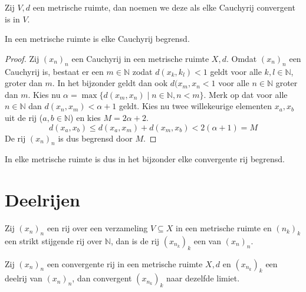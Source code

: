 \documentclass[main.tex]{subfiles}
\begin{document}
\begin{de}
  \label{de:metrische-ruimte-volledig}
  Zij $V,d$ een metrische ruimte, dan noemen we deze  als elke Cauchyrij convergent is in $V$.
\end{de}

\begin{st}
  \label{st:metrische-ruimte-cauchy-dan-begrensd}
  In een metrische ruimte is elke Cauchyrij begrensd.

  \begin{proof}
    Zij $(x_{n})_{n}$ een Cauchyrij in een metrische ruimte $X,d$.
    Omdat $(x_{n})_{n}$ een Cauchyrij is, bestaat er een $m\in \mathbb{N}$ zodat $d(x_{k},k_{l}) < 1$ geldt voor alle $k,l \in \mathbb{N}$, groter dan $m$.
    In het bijzonder geldt dan ook $d(x_{m},x_{n} < 1$ voor alle $n\in \mathbb{N}$ groter dan $m$.
    Kies nu $\alpha = \max\{ d(x_{m},x_{n}) \mid n\in \mathbb{N}, n < m \}$.
    Merk op dat voor alle $n\in \mathbb{N}$ dan $d(x_{n},x_{m}) < \alpha + 1$ geldt.
    Kies nu twee willekeurige elementen $x_{a},x_{b}$ uit de rij ($a,b\in \mathbb{N}$) en kies $M=2\alpha+2$.
    \[ d(x_{a},x_{b}) \le d(x_{a},x_{m}) + d(x_{m},x_{b}) < 2(\alpha+1) = M \]
    De rij $(x_{n})_{n}$ is dus begrensd door $M$.
  \end{proof}
\end{st}

\begin{gev}
  In elke metrische ruimte is dus in het bijzonder elke convergente rij begrensd.
\end{gev}

\section{Deelrijen}
\label{sec:deelrijen}

\begin{de}
  Zij $(x_{n})_{n}$ een rij over een verzameling $V\subseteq X$ in een metrische ruimte en $(n_{k})_{k}$ een strikt stijgende rij over $\mathbb{N}$, dan is de rij $(x_{n_{k}})_{k}$ een  van $(x_{n})_{n}$.
\end{de}

\begin{st}
  \label{st:deelrij-zelfde-limiet-als-convergente-moederrij}
  Zij $(x_{n})_{n}$ een convergente rij in een metrische ruimte $X,d$ en $(x_{n_{k}})_{k}$ een deelrij van $(x_{n})_{n}$, dan convergent $(x_{n_{k}})_{k}$ naar dezelfde limiet.
\end{st}
\end{document}
